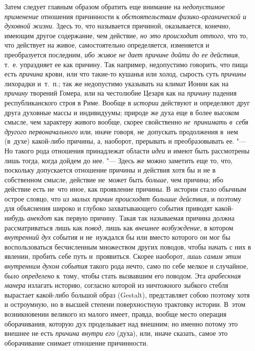 Затем следует главным образом обратить еще внимание на
{\em недопустимое применение} отношения причинности к
{\em обстоятельствам физико-органической и духовной жизни}. Здесь то, что
называется причиной, оказывается, конечно, имеющим другое содержание, чем
действие, {\em но это происходит оттого}, что то, что действует на живое,
самостоятельно определяется, изменяется и преобразуется последним,
{\em ибо живое не дает причине дойти до ее действия}, т.~е. упраздняет ее как
причину. Так например, недопустимо говорить, что пища есть {\em причина} крови,
или что такие-то кушанья или холод, сырость суть {\em причины} лихорадки
и~т.~п.; так же недопустимо указывать на климат Ионии как на {\em причину}
творений Гомера, или на честолюбие Цезаря как на {\em причину} падения
республиканского строя в Риме. Вообще в {\em истории} действуют и определяют
друг друга духовные массы и индивидуумы; природе же духа еще в более высоком
смысле, чем характеру живого вообще, скорее свойственно
{\em не~принимать в~себя другого первоначального} или, иначе говоря,
не~допускать продолжения в~нем (в~духе) какой-либо причины, а, наоборот,
прерывать и преобразовывать ее. "--- Но такого рода отношения принадлежат
области {\em идеи} и имеют быть рассмотрены лишь тогда, когда дойдем до нее.
"--- Здесь же можно заметить еще то, что, поскольку допускается отношение
причины и действия хотя бы и не в собственном смысле, действие не~может быть
{\em больше}, чем причина; ибо действие есть не~что иное, как проявление
причины. В~истории стало обычным острое словцо, что {\em из малых причин
происходят большие действия}, и поэтому для объяснения широко и глубоко
захватывающего события приводят какой-нибудь {\em анекдот} как первую причину.
Такая так называемая причина должна рассматриваться лишь как {\em повод}, лишь
как {\em внешнее возбуждение}, в котором {\em внутренний дух} события и
не~нуждался бы или вместо которого он мог бы воспользоваться бесчисленным
множеством других поводов, чтобы начать с них в явлении, пробить себе путь
и~проявиться. Скорее наоборот, {\em лишь самим этим внутренним духом события}
такого рода нечто, само по себе мелкое и случайное, {\em было определено}
к~тому, чтобы стать вызвавшим его поводом. Эта {\em арабескная манера} излагать
историю, согласно которой из ничтожного зыбкого стебля вырастает какой-либо
большой образ (Gestalt), представляет собою поэтому хотя и остроумную, но в
высшей степени поверхностную трактовку истории. В~этом возникновении великого
из малого имеет, правда, вообще место операция оборачивания, которую дух
проделывает над внешним; но именно потому это внешнее не есть
{\em причина внутри его} (духа), или, иначе сказать, самое это оборачивание
снимает отношение причинности.

